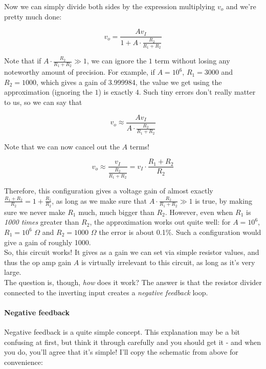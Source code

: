 Now we can simply divide both sides by the expression multiplying $v_o$ and we're pretty much done:

\[ v_o = \frac{A v_I}{1 + A \cdot \frac{R_2}{R_1 + R_2}} \]

Note that if $\displaystyle A \cdot \frac{R_2}{R_1 + R_2} \gg 1$, we can ignore the $1$ term without losing any noteworthy amount of precision. For example, if $A = 10^6$, $R_1 = 3000$ and $R_2 = 1000$, which gives a gain of 3.999984, the value we get using the approximation (ignoring the $1$) is exactly $4$. Such tiny errors don't really matter to us, so we can say that

\[ v_o \approx \frac{A v_I}{A \cdot \frac{R_2}{R_1 + R_2}} \]

Note that we can now cancel out the $A$ terms!

\[ v_o \approx \frac{v_I}{\frac{R_2}{R_1 + R_2}} = v_I \cdot \frac{R_1 + R_2}{R_2} \]

Therefore, this configuration gives a voltage gain of almost exactly $\displaystyle \frac{R_1 + R_2}{R_2} = 1 + \frac{R_1}{R_2}$, as long as we make sure that $\displaystyle A \cdot \frac{R_2}{R_1 + R_2} \gg 1$ is true, by making sure we never make $R_1$ much, much bigger than $R_2$. However, even when $R_1$ is \emph{1000 times} greater than $R_2$, the approximation works out quite well: for $A = 10^6$, $R_1 = 10^6$ $\Omega$ and $R_2 = 1000$ $\Omega$ the error is about 0.1\%. Such a configuration would give a gain of roughly 1000.\\

So, this circuit works! It gives as a gain we can set via simple resistor values, and thus the op amp gain $A$ is virtually irrelevant to this circuit, as long as it's very large.\\
The question is, though, \emph{how} does it work? The answer is that the resistor divider connected to the inverting input creates a \emph{negative feedback} loop.

\newpage

\paragraph{Negative feedback}
Negative feedback is a quite simple concept. This explanation may be a bit confusing at first, but think it through carefully and you should get it - and when you do, you'll agree that it's simple! I'll copy the schematic from above for convenience:\\

